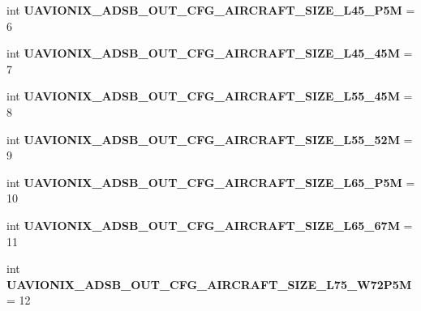 \begin{DoxyCompactItemize}
\item 
\mbox{\label{namespacepymavlink_1_1dialects_1_1v10_afa3099f0338d38b06ca5451a5bcebefd}} 
int {\bfseries U\+A\+V\+I\+O\+N\+I\+X\+\_\+\+A\+D\+S\+B\+\_\+\+O\+U\+T\+\_\+\+C\+F\+G\+\_\+\+A\+I\+R\+C\+R\+A\+F\+T\+\_\+\+S\+I\+Z\+E\+\_\+\+L45\+\_\+P5M} = 6
\item 
\mbox{\label{namespacepymavlink_1_1dialects_1_1v10_adfeaf396f8f32694ffa4ca7fa9d2fda8}} 
int {\bfseries U\+A\+V\+I\+O\+N\+I\+X\+\_\+\+A\+D\+S\+B\+\_\+\+O\+U\+T\+\_\+\+C\+F\+G\+\_\+\+A\+I\+R\+C\+R\+A\+F\+T\+\_\+\+S\+I\+Z\+E\+\_\+\+L45\+\_\+45M} = 7
\item 
\mbox{\label{namespacepymavlink_1_1dialects_1_1v10_ad7841793a3a48868fb8a5be757e25774}} 
int {\bfseries U\+A\+V\+I\+O\+N\+I\+X\+\_\+\+A\+D\+S\+B\+\_\+\+O\+U\+T\+\_\+\+C\+F\+G\+\_\+\+A\+I\+R\+C\+R\+A\+F\+T\+\_\+\+S\+I\+Z\+E\+\_\+\+L55\+\_\+45M} = 8
\item 
\mbox{\label{namespacepymavlink_1_1dialects_1_1v10_a274752d78ba421a4d4477ab9604697b9}} 
int {\bfseries U\+A\+V\+I\+O\+N\+I\+X\+\_\+\+A\+D\+S\+B\+\_\+\+O\+U\+T\+\_\+\+C\+F\+G\+\_\+\+A\+I\+R\+C\+R\+A\+F\+T\+\_\+\+S\+I\+Z\+E\+\_\+\+L55\+\_\+52M} = 9
\item 
\mbox{\label{namespacepymavlink_1_1dialects_1_1v10_a305429500fc19432c72dae75342efc09}} 
int {\bfseries U\+A\+V\+I\+O\+N\+I\+X\+\_\+\+A\+D\+S\+B\+\_\+\+O\+U\+T\+\_\+\+C\+F\+G\+\_\+\+A\+I\+R\+C\+R\+A\+F\+T\+\_\+\+S\+I\+Z\+E\+\_\+\+L65\+\_\+P5M} = 10
\item 
\mbox{\label{namespacepymavlink_1_1dialects_1_1v10_aacffda708bb8ee3de923c5c6ff13156b}} 
int {\bfseries U\+A\+V\+I\+O\+N\+I\+X\+\_\+\+A\+D\+S\+B\+\_\+\+O\+U\+T\+\_\+\+C\+F\+G\+\_\+\+A\+I\+R\+C\+R\+A\+F\+T\+\_\+\+S\+I\+Z\+E\+\_\+\+L65\+\_\+67M} = 11
\item 
\mbox{\label{namespacepymavlink_1_1dialects_1_1v10_a59a4d13866f16f3924005f33222151ee}} 
int {\bfseries U\+A\+V\+I\+O\+N\+I\+X\+\_\+\+A\+D\+S\+B\+\_\+\+O\+U\+T\+\_\+\+C\+F\+G\+\_\+\+A\+I\+R\+C\+R\+A\+F\+T\+\_\+\+S\+I\+Z\+E\+\_\+\+L75\+\_\+\+W72\+P5M} = 12

\end{DoxyCompactItemize}
